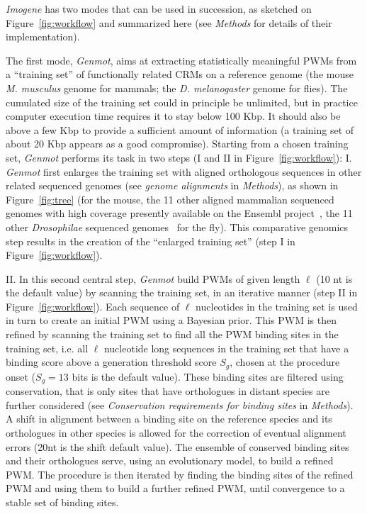 \documentclass[a4,center,fleqn]{NAR}
\begin{document}
\textit{Imogene} has two modes that can be used in succession, as sketched on
Figure~\ref{fig:workflow}  and summarized here (see {\em Methods} for details
of their implementation).

The first mode, {\em Genmot}, aims at extracting statistically meaningful PWMs
from a ``training set'' of functionally related CRMs on a reference genome (the
mouse {\em M. musculus} genome for mammals;  the {\em D. melanogaster} genome
for flies). 
The cumulated size of the training set could in principle be unlimited, but in
practice computer execution time requires it to stay below 100 Kbp.
It should also be above  a few Kbp to provide a sufficient amount of
information (a training set of about
20 Kbp appears as a good compromise).
Starting from a chosen training set, {\em Genmot}  performs its task in two
steps (I and II in  Figure~\ref{fig:workflow}): 
  I. {\em Genmot}  first enlarges the training set with aligned orthologous
  sequences in other related sequenced genomes (see {\em genome alignments} in
  {\em Methods}), as shown in Figure~\ref{fig:tree} (for the mouse, the 11
  other aligned mammalian sequenced genomes with high coverage presently
  available on the Ensembl project~\cite{Flicek2012fk},  the 11 other {\em
  Drosophilae} sequenced genomes~\cite{clark2007evolution} for the fly).
  This comparative genomics step results in the creation of the ``enlarged
  training set'' (step I in Figure~\ref{fig:workflow}).

  II. In this second central step, {\em Genmot}  build PWMs of given length
  $\ell$ (10 nt is the default value) by scanning the training set, in an
  iterative manner (step II  in  Figure~\ref{fig:workflow}).
  Each sequence of $\ell$ nucleotides in the training set is used in turn to
  create an initial PWM using a Bayesian prior.
  This PWM is then refined by scanning the  training set to find all the
  PWM binding sites in the training set, i.e. all $\ell$ nucleotide long
  sequences in the training set that have a binding score above a generation
  threshold score $S_g$, chosen at the procedure onset ($S_g=13$ bits is the
  default value).
  These binding sites are filtered using conservation,  that is only sites that
  have orthologues in distant species are further considered (see {\em
  Conservation requirements for binding sites} in {\em Methods}).  A shift in
  alignment between a binding site on the reference species and its orthologues
  in other species  is allowed for the correction of eventual alignment errors
  (20nt is the shift default value).
  The ensemble of conserved binding sites and their orthologues  serve, using
  an evolutionary model, to build a refined PWM.
  The procedure is then iterated by finding the binding sites of the refined
  PWM and using them to build a further refined PWM, until convergence to
  a stable set of binding sites.
\end{document}
